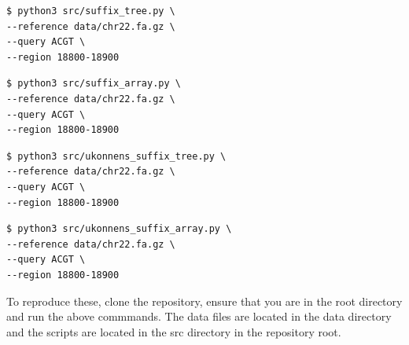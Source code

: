 \documentclass[11pt, letterpaper]{article}
\begin{document}
\begin{verbatim}
$ python3 src/suffix_tree.py \
--reference data/chr22.fa.gz \
--query ACGT \
--region 18800-18900
\end{verbatim}

\begin{verbatim}
$ python3 src/suffix_array.py \
--reference data/chr22.fa.gz \
--query ACGT \
--region 18800-18900
\end{verbatim}

\begin{verbatim}
$ python3 src/ukonnens_suffix_tree.py \
--reference data/chr22.fa.gz \
--query ACGT \
--region 18800-18900
\end{verbatim}

\begin{verbatim}
$ python3 src/ukonnens_suffix_array.py \
--reference data/chr22.fa.gz \
--query ACGT \
--region 18800-18900
\end{verbatim}

To reproduce these, clone the repository, 
ensure that you are in the root directory and run the above commmands.
The data files are located in the data directory
and the scripts are located in the src directory
in the repository root.
\end{document}
